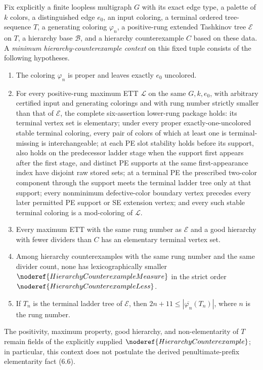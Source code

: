 \begin{definition}
Fix explicitly a finite loopless multigraph \(G\) with its exact edge type,
a palette of \(k\) colors, a distinguished edge \(e_0\), an input coloring,
a terminal ordered tree-sequence \(T\), a generating coloring \(\varphi_n\),
a positive-rung extended Tashkinov tree \(\mathcal E\) on \(T\), a hierarchy
base \(\mathcal B\), and a hierarchy counterexample \(C\) based on these data.
A \emph{minimum hierarchy-counterexample context} on this fixed tuple consists
of the following hypotheses.
\begin{enumerate}
\item The coloring \(\varphi_n\) is proper and leaves exactly \(e_0\)
uncolored.
\item For every positive-rung maximum ETT \(\mathcal L\) on the same
\(G,k,e_0\), with arbitrary certified input and generating colorings and
with rung number strictly smaller than that of \(\mathcal E\), the complete
six-assertion lower-rung package holds: its terminal vertex set is elementary;
under every proper exactly-one-uncolored stable terminal coloring, every pair
of colors of which at least one is terminal-missing is interchangeable;
at each PE slot stability holds before its support, also holds on the
predecessor ladder stage when the support first appears after the first
stage, and distinct PE supports at the same first-appearance index have
disjoint raw stored sets; at a terminal PE the prescribed two-color component
through the support meets the terminal ladder tree only at that support;
every nonminimum defective-color boundary vertex precedes every later
permitted PE support or SE extension vertex; and every such stable terminal
coloring is a mod-coloring of \(\mathcal L\).
\item Every maximum ETT with the same rung number as \(\mathcal E\) and a
good hierarchy with fewer dividers than \(C\) has an elementary terminal
vertex set.
\item Among hierarchy counterexamples with the same rung number and the
same divider count, none has lexicographically smaller
\(\noderef{HierarchyCounterexampleMeasure}\) in the strict order
\(\noderef{HierarchyCounterexampleLess}\).
\item If \(T_n\) is the terminal ladder tree of \(\mathcal E\), then
\(2n+11\leq |\overline{\varphi_n}(T_n)|\), where \(n\) is the rung number.
\end{enumerate}
The positivity, maximum property, good hierarchy, and non-elementarity of
\(T\) remain fields of the explicitly supplied
\(\noderef{HierarchyCounterexample}\); in particular, this context does not
postulate the derived penultimate-prefix elementarity fact (6.6).
\end{definition}
